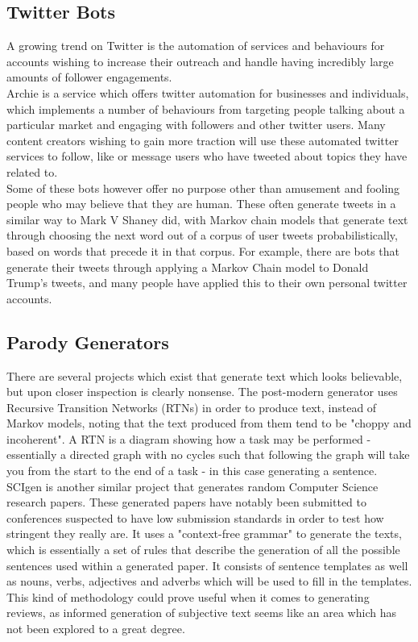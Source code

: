 \subsection{Twitter Bots}
A growing trend on Twitter is the automation of services and behaviours for accounts wishing to increase their outreach and handle having incredibly large amounts of follower engagements. \\
%
Archie is a service which offers twitter automation for businesses and individuals, which implements a number of behaviours from targeting people talking about a particular market and engaging with followers and other twitter users. Many content creators wishing to gain more traction will use these automated twitter services to follow, like or message users who have tweeted about topics they have related to.\\
%
Some of these bots however offer no purpose other than amusement and fooling people who may believe that they are human. These often generate tweets in a similar way to Mark V Shaney did, with Markov chain models that generate text through choosing the next word out of a corpus of user tweets probabilistically, based on words that precede it in that corpus. For example, there are bots that generate their tweets through applying a Markov Chain model to Donald Trump's tweets, and many people have applied this to their own personal twitter accounts. 


\subsection{Parody Generators}
There are several projects which exist that generate text which looks believable, but upon closer inspection is clearly nonsense.
The post-modern generator uses Recursive Transition Networks (RTNs) in order to produce text, instead of Markov models, noting that the text produced from them tend to be "choppy and incoherent". A RTN is a diagram showing how a task may be performed - essentially a directed graph with no cycles such that following the graph will take you from the start to the end of a task - in this case generating a sentence.\\
SCIgen is another similar project that generates random Computer Science research papers. These generated papers have notably been submitted to conferences suspected to have low submission standards in order to test how stringent they really are. It uses a "context-free grammar" to generate the texts, which is essentially a set of rules that describe the generation of all the possible sentences used within a generated paper. It consists of sentence templates as well as nouns, verbs, adjectives and adverbs which will be used to fill in the templates. This kind of methodology could prove useful when it comes to generating reviews, as informed generation of subjective text seems like an area which has not been explored to a great degree.
\\


